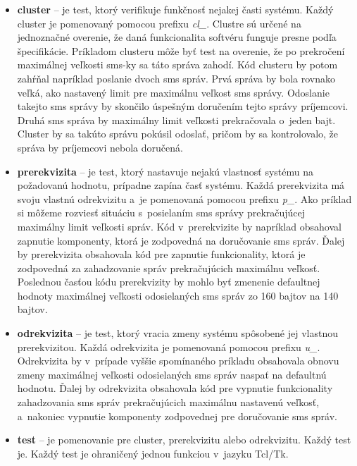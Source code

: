 \begin{itemize}
\item \textbf{cluster} -- je test, ktorý verifikuje funkčnosť nejakej 
časti systému. Každý cluster je pomenovaný pomocou prefixu \emph{cl\_}. 
Clustre sú určené na jednoznačné overenie, že daná funkcionalita softvéru
funguje presne podľa špecifikácie. Príkladom clusteru môže byť test na
overenie, že po prekročení maximálnej veľkosti sms-ky sa táto správa 
zahodí. Kód clusteru by potom zahŕňal napríklad poslanie dvoch sms správ.
Prvá správa by bola rovnako veľká, ako nastavený limit pre maximálnu 
veľkost sms správy. 
Odoslanie takejto sms správy by skončilo úspešným doručením tejto správy
príjemcovi. 
Druhá sms správa by maximálny limit veľkosti prekračovala o~jeden bajt.
Cluster by sa takúto správu pokúsil odoslať, pričom by sa kontrolovalo,
že správa by príjemcovi nebola doručená.
\item \textbf{prerekvizita} -- je test, ktorý nastavuje nejakú vlastnosť 
systému na požadovanú hodnotu, prípadne zapína časť systému. 
Každá prerekvizita má svoju vlastnú odrekvizitu a~je pomenovaná pomocou 
prefixu \emph{p\_}. Ako príklad si môžeme rozviesť situáciu s~posielaním
sms správy prekračujúcej maximálny limit veľkosti správ. Kód v~prerekvizite
by napríklad obsahoval zapnutie komponenty, ktorá je zodpovedná na doručovanie
sms správ. Ďalej by prerekvizita obsahovala kód pre zapnutie funkcionality,
ktorá je zodpovedná za zahadzovanie správ prekračujúcich maximálnu veľkosť.
Poslednou časťou kódu prerekvizity by mohlo byť zmenenie defaultnej hodnoty
maximálnej veľkosti odosielaných sms správ zo 160 bajtov na 140 bajtov.
\item \textbf{odrekvizita} -- je test, ktorý vracia zmeny systému 
spôsobené jej vlastnou prerekvizitou. Každá odrekvizita je pomenovaná
pomocou prefixu \emph{u\_}. Odrekvizita by v~prípade vyššie spomínaného 
príkladu obsahovala obnovu zmeny maximálnej veľkosti odosielaných sms správ
naspať na defaultnú hodnotu. Ďalej by odrekvizita obsahovala kód pre vypnutie 
funkcionality zahadzovania sms správ prekračujúcich maximálnu nastavenú 
veľkosť, a~nakoniec vypnutie komponenty zodpovednej pre doručovanie sms 
správ.
\item \textbf{test} -- je pomenovanie pre cluster, prerekvizitu alebo 
odrekvizitu. Každý test je. Každý test je ohraničený jednou funkciou
v~jazyku Tcl/Tk. 

\end{itemize}

